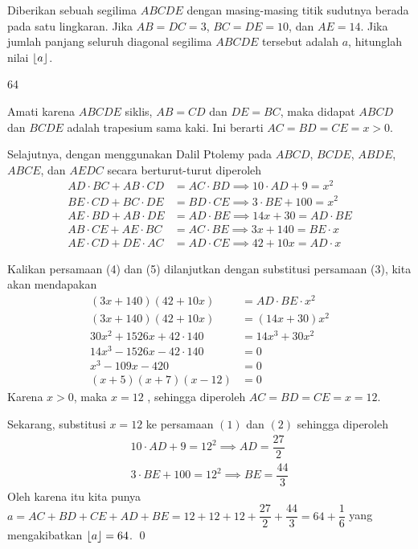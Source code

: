 \documentclass[11pt]{scrartcl}
\begin{document}
	\begin{soalbaru}
		Diberikan sebuah segilima $ABCDE$ dengan masing-masing titik sudutnya berada pada satu lingkaran. Jika $AB=DC=3$, $BC=DE=10$, dan $AE=14$. Jika jumlah panjang seluruh diagonal segilima $ABCDE$ tersebut adalah $a$, hitunglah nilai $\left\lfloor a \right\rfloor$.
		\begin{jawaban}
		64
		\end{jawaban}
		\begin{solusi}
		Amati karena $ABCDE$ siklis, $AB=CD$ dan $DE=BC$, maka didapat $ABCD$ dan $BCDE$ adalah trapesium sama kaki. Ini berarti $AC=BD=CE=x > 0$.
		
		Selajutnya, dengan menggunakan Dalil Ptolemy pada $ABCD$, $BCDE$, $ABDE$, $ABCE$, dan $AEDC$ secara berturut-turut diperoleh 
		\begin{align}
		AD \cdot BC + AB \cdot CD &= AC \cdot BD \implies 10\cdot AD+9 = x^2\\
		BE \cdot CD + BC \cdot DE &= BD \cdot CE \implies 3 \cdot BE + 100 = x^2\\
		AE \cdot BD + AB \cdot DE &= AD \cdot BE \implies 14x+30 = AD \cdot BE\\
		AB \cdot CE + AE \cdot BC &= AC \cdot BE \implies 3x+140 = BE \cdot x\\
		AE \cdot CD + DE \cdot AC &= AD \cdot CE \implies 42+10x=AD \cdot x
		\end{align}
		
		Kalikan persamaan (4) dan (5) dilanjutkan dengan substitusi persamaan (3), kita akan mendapakan 
		\begin{align*}
		(3x+140)(42+10x) &= AD \cdot BE \cdot x^2\\
		(3x+140)(42+10x) &= (14x+30)x^2\\
		30x^2+1526x+42\cdot140 &= 14x^3+30x^2\\
		14x^3-1526x-42\cdot 140 &= 0\\
		x^3-109x-420 &= 0\\
		(x+5)(x+7)(x-12) &= 0
		\end{align*}
		 Karena $x>0$, maka $x=12$ , sehingga diperoleh $AC = BD = CE = x =12$.
		 
		 Sekarang, substitusi $x=12$ ke persamaan $(1)$ dan $(2)$ sehingga diperoleh 
		 \begin{align*}
		 10\cdot AD + 9 = 12^2 \implies AD = \dfrac{27}{2}\\
		 3\cdot BE + 100 = 12^2 \implies BE = \dfrac{44}{3}
		 \end{align*}
		 Oleh karena itu kita punya $a = AC +BD +CE +AD +BE = 12+12+12+\dfrac{27}{2}+\dfrac{44}{3}=64+\dfrac{1}{6}$ yang mengakibatkan $\left\lfloor a \right\rfloor=64$. \qed
		
		\end{solusi}
	\end{soalbaru}
	
\end{document}
